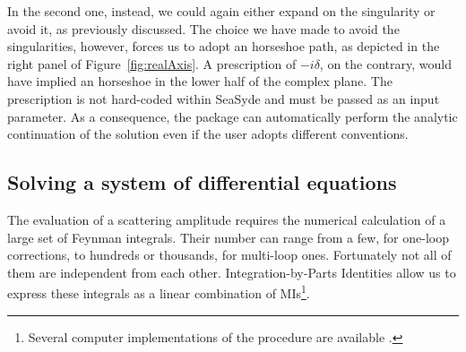 \documentclass[final,1p,times]{elsarticle}
\begin{document}
In the second one, instead, we could again either expand on the singularity or avoid it, as previously discussed. The choice we have made to avoid the singularities, however, forces us to adopt an horseshoe path, as depicted in the right panel of Figure~\ref{fig:realAxis}.
A prescription of $-i\delta$, on the contrary, would have implied an horseshoe in the lower half of the complex plane.
The prescription is not hard-coded within {\sc SeaSyde} and must be passed as an input parameter. As a consequence, the package can automatically perform the analytic continuation of the solution even if the user adopts different conventions.

\subsection{Solving a system of differential equations}
\label{sec:system}
The evaluation of a scattering amplitude requires the numerical calculation of a large set of Feynman integrals. Their number can range from a few, for one-loop corrections, to hundreds or thousands, for multi-loop ones. Fortunately not all of them are independent from each other.  Integration-by-Parts Identities \cite{Tkachov:1981wb,Chetyrkin:1981qh,Laporta:2001dd} allow us to express these integrals as a linear combination of MIs\footnote{Several computer implementations of the procedure are available \cite{Anastasiou:2004vj,Studerus:2009ye,vonManteuffel:2012np,Lee:2012cn,Lee:2013mka,Smirnov:2008iw,Smirnov:2014hma,Maierhoefer:2017hyi,Klappert:2020nbg}.}.
\end{document}
